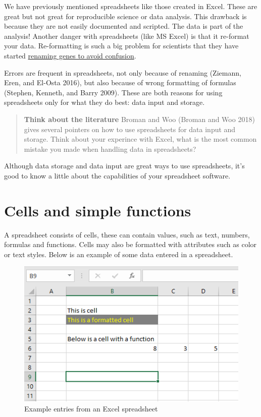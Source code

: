 \documentclass[
  11pt,
  letterpaper,
]{scrbook}
\begin{document}
We have previously mentioned spreadsheets like those created in Excel.
These are great but not great for reproducible science or data analysis.
This drawback is because they are not easily documented and scripted.
The data is part of the analysis! Another danger with spreadsheets (like
MS Excel) is that it re-format your data. Re-formatting is such a big
problem for scientists that they have started
\href{https://www.theverge.com/2020/8/6/21355674/human-genes-rename-microsoft-excel-misreading-dates}{renaming
genes to avoid confusion}.

Errors are frequent in spreadsheets, not only because of renaming
(Ziemann, Eren, and El-Osta 2016), but also because of wrong formatting
of formulas (Stephen, Kenneth, and Barry 2009). These are both reasons
for using spreadsheets only for what they do best: data input and
storage.

\begin{quote}
\textbf{Think about the literature} Broman and Woo (Broman and Woo 2018)
gives several pointers on how to use spreadsheets for data input and
storage. Think about your experince with Excel, what is the most common
mistake you made when handling data in spreadsheets?
\end{quote}

Although data storage and data input are great ways to use spreadsheets,
it's good to know a little about the capabilities of your spreadsheet
software.

\hypertarget{cells-and-simple-functions}{%
\section{Cells and simple functions}\label{cells-and-simple-functions}}

A spreadsheet consists of cells, these can contain values, such as text,
numbers, formulas and functions. Cells may also be formatted with
attributes such as color or text styles. Below is an example of some
data entered in a spreadsheet.

\begin{figure}

{\centering \includegraphics[width=1.2\textwidth,height=\textheight]{./images/excel-spreadsheet.png}

}

\caption{Example entries from an Excel spreadsheet}

\end{figure}
\end{document}
